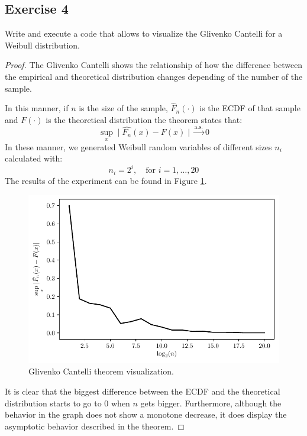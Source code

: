 \documentclass[11pt]{article}
\theoremstyle{definition}
\theoremstyle{remark}
\theoremstyle{remark}
\begin{document}
\subsection*{Exercise 4}
Write and execute a code that allows to visualize the Glivenko
Cantelli for a Weibull distribution.
\begin{proof}
  The Glivenko Cantelli shows the relationship of how the difference
  between the empirical and theoretical distribution changes depending
  of the number of the sample.

  In this manner, if $n$ is the size of the sample, $\hat{F}_n(\cdot)$ is
  the ECDF of that sample and $F(\cdot)$ is the theoretical distribution
  the theorem states that:
  \begin{equation*}
    \sup_x \mid \hat{F_n}(x) - F(x) \mid \xrightarrow[]{\text{a.s.}} 0
  \end{equation*}
  In these manner, we generated Weibull random variables of different
  sizes $n_i$ calculated with:
  \begin{equation*}
    n_i = 2^i, \quad \text{for } i=1,\ldots,20
  \end{equation*}
  The results of the experiment can be found in Figure \ref{fig:ex4}.
  \begin{figure}[H]
    \centering
    \includegraphics[scale=0.5]{../figs/weibull.pdf}
    \caption{Glivenko Cantelli theorem visualization.}
    \label{fig:ex4}
  \end{figure}

  It is clear that the biggest difference between the ECDF and the
  theoretical distribution starts to go to 0 when $n$ gets
  bigger. Furthermore, although the behavior in the graph does not
  show a monotone decrease, it does display the asymptotic behavior
  described in the theorem.
\end{proof}
\end{document}
